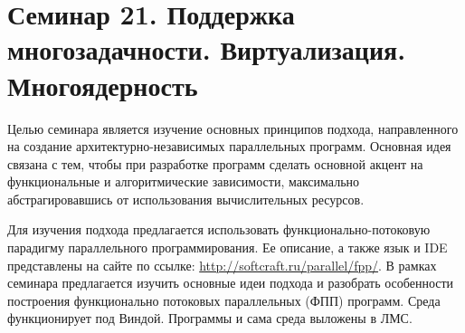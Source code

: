 \chapter[21]{Семинар 21. Поддержка многозадачности. Виртуализация. Многоядерность}

Целью семинара является изучение основных принципов подхода, направленного на создание архитектурно-независимых параллельных программ. Основная идея связана с тем, чтобы при разработке программ сделать основной акцент на функциональные и алгоритмические зависимости, максимально абстрагировавшись от использования вычислительных ресурсов.

Для изучения подхода предлагается использовать функционально-потоковую парадигму параллельного программирования. Ее описание, а также язык и IDE представлены на сайте по ссылке: \url{http://softcraft.ru/parallel/fpp/}. В рамках семинара предлагается изучить основные идеи подхода и разобрать особенности построения функционально потоковых параллельных (ФПП) программ. Среда функционирует под Виндой. Программы и сама среда выложены в ЛМС.

